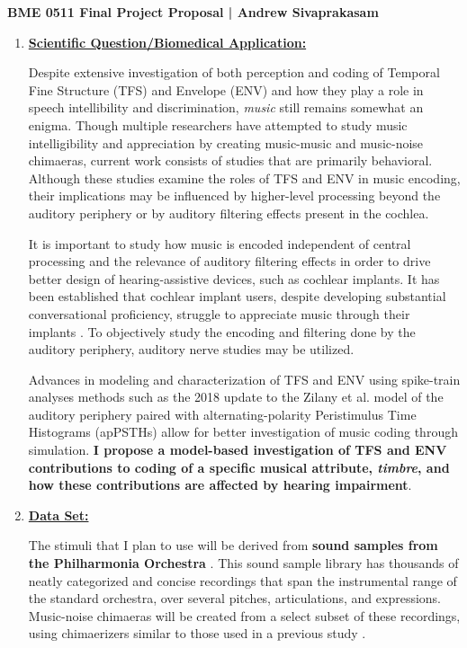 \documentclass[9pt]{article}
\begin{document}
\begin{center}
{\Large \textbf{BME 0511 Final Project Proposal | Andrew Sivaprakasam}}
\end{center}
\vspace{.25em}
\begin{enumerate}

\item \textbf{\underline{Scientific Question/Biomedical Application:}}

Despite extensive investigation of both perception and coding of Temporal Fine Structure (TFS) and Envelope (ENV) and how they play a role in speech intellibility and discrimination, \textit{music} still remains somewhat an enigma. Though multiple researchers have attempted to study music intelligibility and appreciation by creating music-music and music-noise chimaeras, current work consists of studies that are primarily behavioral. Although these studies examine the roles of TFS and ENV in music encoding, their implications may be influenced by higher-level processing beyond the auditory periphery or by auditory filtering effects present in the cochlea. 

It is important to study how music is encoded independent of central processing and the relevance of auditory filtering effects in order to drive better design of hearing-assistive devices, such as cochlear implants. It has been established that cochlear implant users, despite developing substantial conversational proficiency, struggle to appreciate music through their implants \cite{heng_impaired_2011}. To objectively study the encoding and filtering done by the auditory periphery, auditory nerve studies may be utilized.

Advances in modeling and characterization of TFS and ENV using spike-train analyses methods such as the 2018 update to the Zilany et al. model of the auditory periphery paired with alternating-polarity Peristimulus Time Histograms (apPSTHs) allow for better investigation of music coding through simulation. \textbf{I propose a model-based investigation of TFS and ENV contributions to coding of a specific musical attribute, \textit{timbre}, and how these contributions are affected by hearing impairment}.   

\item \textbf{\underline{Data Set:}}

The stimuli that I plan to use will be derived from \textbf{sound samples from the Philharmonia Orchestra} \cite{noauthor_sound_nodate}. This sound sample library has thousands of neatly categorized and concise recordings that span the instrumental range of the standard orchestra, over several pitches, articulations, and expressions. Music-noise chimaeras will be created from a select subset of these recordings, using chimaerizers similar to those used in a previous study \cite{smith_chimaeric_2002}. 


\end{enumerate}
\end{document}
